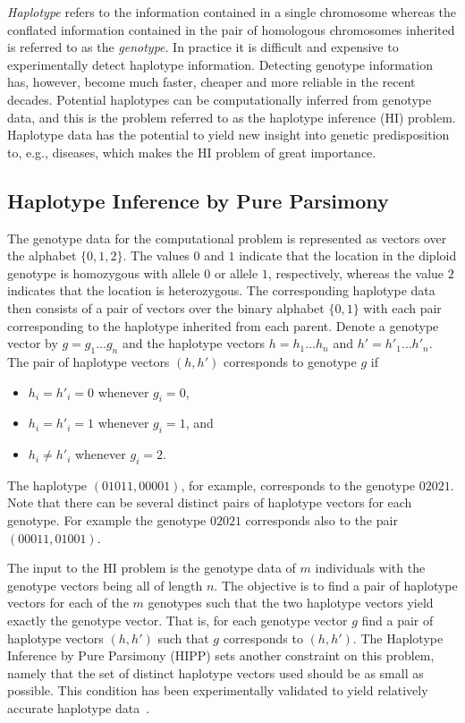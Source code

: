 \documentclass[12pt,a4paper]{article}
\begin{document}
\emph{Haplotype} refers to the information contained in a single chromosome whereas the conflated information contained in the pair of  homologous chromosomes inherited is referred to as the \emph{genotype}.
In practice it is difficult and expensive to experimentally detect haplotype information.
Detecting genotype information has, however, become much faster, cheaper and more reliable in the recent decades.
Potential haplotypes can be computationally inferred from genotype data, and this is the problem referred to as the haplotype inference (HI) problem.
Haplotype data has the potential to yield new insight into genetic predisposition to, e.g., diseases, which makes the HI problem of great importance.

\subsection{Haplotype Inference by Pure Parsimony}
The genotype data for the computational problem is represented as vectors over the alphabet $\{0, 1, 2\}$. 
The values $0$ and $1$ indicate that the location in the diploid genotype is homozygous with allele $0$ or allele $1$, respectively, 
whereas the value $2$ indicates that the location is heterozygous.
The corresponding haplotype data then consists of a pair of vectors over the binary alphabet $\{0, 1\}$ with each pair corresponding to the haplotype inherited from each parent.
Denote a genotype vector by $g=g_1\dots g_n$ and the haplotype vectors $h=h_1\dots h_n$ and $h'=h'_1\dots h'_n$.
The pair of haplotype vectors $(h, h')$ corresponds to genotype $g$ if 
\begin{itemize}
\item $h_i=h'_i=0$ whenever $g_i = 0$,
\item $h_i=h'_i=1$ whenever $g_i = 1$, and
\item $h_i \neq h'_i$ whenever $g_i = 2$.
\end{itemize}
The haplotype $(01011, 00001)$, for example, corresponds to the genotype $02021$.
Note that there can be several distinct pairs of haplotype vectors for each genotype.
For example the genotype $02021$ corresponds also to the pair $(00011, 01001)$.

The input to the HI problem is the genotype data of $m$ individuals with the genotype vectors being all of length $n$.
The objective is to find a pair of haplotype vectors for each of the $m$ genotypes such that the two haplotype vectors yield exactly the genotype vector.
That is, for each genotype vector $g$ find a pair of haplotype vectors $(h, h')$ such that $g$ corresponds to $(h, h')$.
The Haplotype Inference by Pure Parsimony (HIPP) sets another constraint on this problem, namely that the set of distinct haplotype vectors used should be as small as possible.
This condition has been experimentally validated to yield relatively accurate haplotype data~\cite{DBLP:journals/bioinformatics/WangX03a}.
\end{document}
